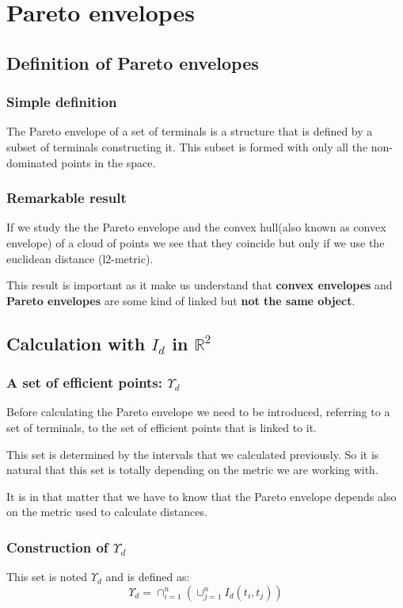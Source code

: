 \chapter{Pareto envelopes}

\section{Definition of Pareto envelopes}%
\subsection{Simple definition}
	The Pareto envelope of a set of terminals is a structure that is defined by a subset of terminals constructing it. This subset is formed with only all the non-dominated points in the space.
	
\subsection{Remarkable result}
	If we study the the Pareto envelope and the convex hull(also known as convex envelope) of a cloud of points we see that they coincide but only if we use the euclidean distance (l2-metric).
	
	This result is important as it make us understand that \textbf{convex envelopes} and \textbf{Pareto envelopes} are some kind of linked but \textbf{not the same object}.
	
\section{Calculation with $I_d$ in $\mathbb{R}^2$}%
\subsection{A set of efficient points: $\Upsilon_d$}%
	Before calculating the Pareto envelope we need to be introduced, referring to a set of terminals, to the set of efficient points that is linked to it.
	
	This set is determined by the intervals that we calculated previously. So it is natural that this set is totally depending on the metric we are working with.
	
	It is in that matter that we have to know that the Pareto envelope depends also on the metric used to calculate distances. 

\subsection{Construction of $\Upsilon_d$} %
\noindent This set is noted $\Upsilon_d$ and is defined as:
\begin{equation}
	\Upsilon_d = \cap^{n}_{i=1}(\cup^{n}_{j=1}I_{d}(t_i,t_j))
\end{equation}

